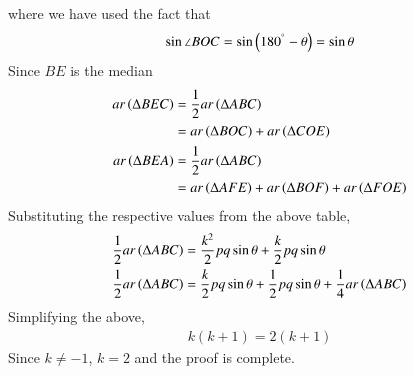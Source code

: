 %
where we have used the fact that 
%
\begin{equation}
\sin \angle BOC = \sin \left(180^{\degree}-\theta\right) = \sin \theta
\end{equation}
%
Since $BE$ is the median
\begin{align}
\begin{split}
ar\left(\Delta BEC\right) &= \frac{1}{2} ar\left(\Delta ABC\right)  
\\
& = ar\left(\Delta BOC\right) + ar\left(\Delta COE\right)\\
ar\left(\Delta BEA\right) &= \frac{1}{2} ar\left(\Delta ABC\right)
\\
& = ar\left(\Delta AFE\right) + ar\left(\Delta BOF\right) +  ar\left(\Delta FOE\right)  
\end{split}
\end{align}
%
Substituting the respective values from the above table,
\begin{align}
\begin{split}
\frac{1}{2} ar\left(\Delta ABC\right) &= \frac{k^2}{2}pq \sin \theta + \frac{k}{2}pq \sin \theta
\\
\frac{1}{2} ar\left(\Delta ABC\right) &= \frac{k}{2}pq \sin \theta + \frac{1}{2}pq \sin \theta + \frac{1}{4} ar\left(\Delta ABC\right)
\end{split}
\end{align}
%
Simplifying the above,
%
\begin{align}
k(k+1) = 2(k+1)
\end{align}
%
Since $k \neq -1$, $k = 2$ and the proof is complete.

